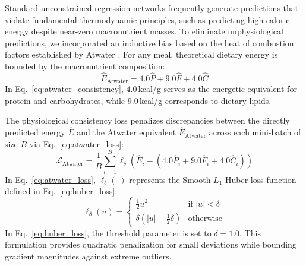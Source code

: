 \documentclass[utf8]{FrontiersinVancouver}
\begin{document}
Standard unconstrained regression networks frequently generate predictions that violate fundamental thermodynamic principles, such as predicting high caloric energy despite near-zero macronutrient masses. To eliminate unphysiological predictions, we incorporated an inductive bias based on the heat of combustion factors established by Atwater \citep{Atwater1900Physiological}. For any meal, theoretical dietary energy is bounded by the macronutrient composition:
\begin{equation}
    \label{eq:atwater_consistency}
    \hat{E}_{\text{Atwater}} = 4.0 \hat{P} + 9.0 \hat{F} + 4.0 \hat{C}
\end{equation}
In Eq.~\ref{eq:atwater_consistency}, $4.0$\,kcal/g serves as the energetic equivalent for protein and carbohydrates, while $9.0$\,kcal/g corresponds to dietary lipids.

The physiological consistency loss penalizes discrepancies between the directly predicted energy $\hat{E}$ and the Atwater equivalent $\hat{E}_{\text{Atwater}}$ across each mini-batch of size $B$ via Eq.~\ref{eq:atwater_loss}:
\begin{equation}
    \label{eq:atwater_loss}
    \mathcal{L}_{\text{Atwater}} = \frac{1}{B} \sum_{i=1}^B \ell_\delta \left( \hat{E}_i - \left( 4.0 \hat{P}_i + 9.0 \hat{F}_i + 4.0 \hat{C}_i \right) \right)
\end{equation}
In Eq.~\ref{eq:atwater_loss}, $\ell_\delta(\cdot)$ represents the Smooth $L_1$ Huber loss function defined in Eq.~\ref{eq:huber_loss}:
\begin{equation}
    \label{eq:huber_loss}
    \ell_\delta(u) = \begin{cases} 
    \frac{1}{2} u^2 & \text{if } |u| < \delta \\ 
    \delta \left( |u| - \frac{1}{2} \delta \right) & \text{otherwise} 
    \end{cases}
\end{equation}
In Eq.~\ref{eq:huber_loss}, the threshold parameter is set to $\delta = 1.0$. This formulation provides quadratic penalization for small deviations while bounding gradient magnitudes against extreme outliers.
\end{document}
